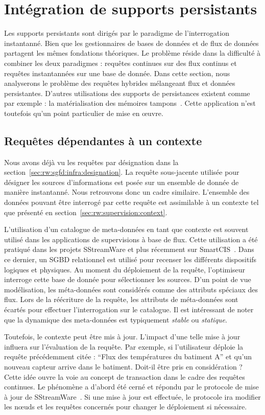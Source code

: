 \section{Intégration de supports persistants}
Les supports persistants sont dirigés par le paradigme de l'interrogation instantanné. Bien que les gestionnaires de bases de données et de flux de données partagent les mêmes fondations théoriques. Le problème réside dans la difficulté à combiner les deux paradigmes : requêtes continues sur des flux continus et requêtes instantannées sur une base de donnée. Dans cette section, nous analyserons le problème des requêtes hybrides mélangeant flux et données persistantes. D'autres utilisations des supports de persistances existent comme par exemple : la matérialisation des mémoires tampons~\cite{Abadi:aurora}. Cette application n'est toutefois qu'un point particulier de mise en œuvre.

\subsection{Requêtes dépendantes à un contexte}
Nous avons déjà vu les requêtes par désignation dans la section~\ref{sec:rw:sgfd:infra:designation}. La requête sous-jacente utilisée pour désigner les sources d'informations est posée sur un ensemble de donnée de manière instantanné. Nous retrouvons donc un cadre similaire. L'ensemble des données pouvant être interrogé par cette requête est assimilable à un contexte tel que présenté en section~\ref{sec:rw:supervision:context}.

L'utilisation d'un catalogue de meta-données en tant que contexte est souvent utilisé dans les applications de supervisions à base de flux. Cette utilisation a été pratiqué dans les projets SStreamWare et plus récemment sur SmartCIS~\cite{Liu:smartcis}. Dans ce dernier, un SGBD relationnel est utilisé pour recenser les différents dispositifs logiques et physiques. Au moment du déploiement de la requête, l'optimiseur interroge cette base de donnée pour sélectionner les sources. D'un point de vue modélisation, les méta-données sont considérés comme des attributs spéciaux des flux. Lors de la réécriture de la requête, les attributs de méta-données sont écartés pour effectuer l'interrogation sur le catalogue. Il est intéressant de noter que la dynamique des meta-données est typiquement \textit{stable} ou \textit{statique}.

Toutefois, le contexte peut être mis à jour. L'impact d'une telle mise à jour influera sur l'évaluation de la requête. Par exemple, si l'utilisateur déploie la requête précédemment citée : \enquote{Flux des températures du batiment A} et qu'un nouveau capteur arrive dans le batiment. Doit-il être pris en considération ? Cette idée ouvre la voie au concept de transaction dans le cadre des requêtes continues. Le phénomène a d'abord été cerné et répondu par le protocole de mise à jour de SStreamWare~\cite{Gurgen:transaction}. Si une mise à jour est effectuée, le protocole ira modifier les nœuds et les requêtes concernés pour changer le déploiement si nécessaire.

